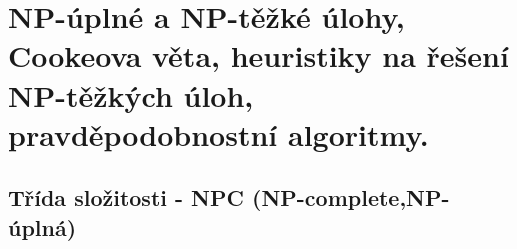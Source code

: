 \section[TAL - NP (complete, hard), Cookeova věta]{NP-úplné a NP-těžké úlohy, Cookeova věta, heuristiky na řešení NP-těžkých úloh, pravděpodobnostní algoritmy.}

\subsection*{Třída složitosti - NPC (NP-complete,NP-úplná)}
\label{heading:npc}